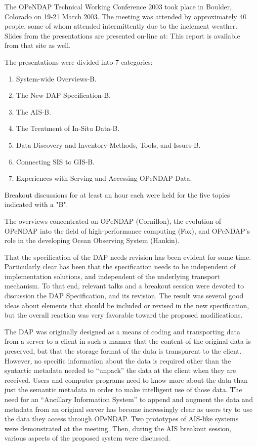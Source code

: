 The OPeNDAP Technical Working Conference 2003 took place in Boulder,
Colorado on 19-21 March 2003.  The meeting was attended by approximately
40 people, some of whom attended intermittently due to the inclement
weather.  Slides from the presentations are presented on-line at:
This report is available from that site as well.

The presentations were divided into 7 categories:
\begin{enumerate}
   \item System-wide Overviews-B.
   \item The New \ac{DAP} Specification-B.
   \item The \ac{AIS}-B.
   \item The Treatment of In-Situ Data-B.
   \item Data Discovery and Inventory Methods, Tools, and Issues-B.
   \item Connecting \ac{SIS} to \ac{GIS}-B.
   \item Experiences with Serving and Accessing \ac{OPeNDAP} Data.
\end{enumerate}

Breakout discussions for at least an hour each were held for the
five topics indicated with a "B".
 
The overviews concentrated on \ac{OPeNDAP} (Cornillon), the evolution
of \ac{OPeNDAP} into the field of high-performance computing (Fox),
and \ac{OPeNDAP}'s role in the developing Ocean Observing System
(Hankin).

That the specification of the \ac{DAP} needs revision has been evident
for some time.  Particularly clear has been that the specification
needs to be independent of implementation solutions, and independent
of the underlying transport mechanism.  To that end, relevant talks
and a breakout session were devoted to discussion the \ac{DAP} Specification,
and its revision.  The result was several good ideas about elements
that should be included or revised in the new specification, but the
overall reaction was very favorable toward the proposed modifications.

The \ac{DAP} was originally designed as a means of coding and transporting
data from a server to a client in such a manner that the content of the
original data is preserved, but that the storage format of the data
is transparent to the client.  However, no specific information about
the data is required other than the syntactic metadata needed to
``unpack'' the data at the client when they are received.  Users and
computer programs need to know more about the data than just the
semantic metadata in order to make intelligent use of those data.
The need for an ``Ancillary Information System'' to append and augment
the data and metadata from an original server has become incressingly
clear as users try to use the data they access through \ac{OPeNDAP}.
Two prototypes of \ac{AIS}-like systems were demonstrated at the
meeting.  Then, during the \ac{AIS} breakout session, various aspects
of the proposed system were discussed.

